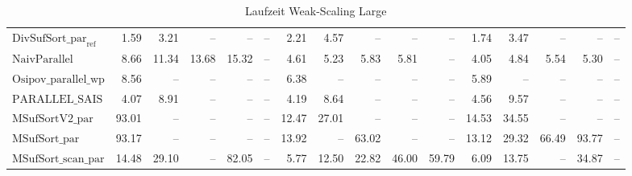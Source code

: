 \begin{table}
{\begin{tabular}{lrrrrrrrrrrrrrrr}
    $\text{DivSufSort\_par}_{\text{ref}}$ & {\color{green!60!black}1.59} & {\color{green!60!black}3.21} & {\color{darkgray}--} & {\color{darkgray}--} & {\color{darkgray}--} & {\color{green!60!black}2.21} & {\color{green!60!black}4.57} & {\color{darkgray}--} & {\color{darkgray}--} & {\color{darkgray}--} & {\color{green!60!black}1.74} & {\color{green!60!black}3.47} & {\color{darkgray}--} & {\color{darkgray}--} & {\color{darkgray}--} \\
    $\text{NaivParallel}$ & 8.66 & {\color{red}11.34} & {\color{red}13.68} & {\color{red}15.32} & {\color{darkgray}--} & 4.61 & 5.23 & {\color{green!60!black}5.83} & {\color{green!60!black}5.81} & {\color{darkgray}--} & 4.05 & 4.84 & {\color{red}5.54} & {\color{green!60!black}5.30} & {\color{darkgray}--} \\
    $\text{Osipov\_parallel\_wp}$ & 8.56 & {\color{darkgray}--} & {\color{darkgray}--} & {\color{darkgray}--} & {\color{darkgray}--} & {\color{red}6.38} & {\color{darkgray}--} & {\color{darkgray}--} & {\color{darkgray}--} & {\color{darkgray}--} & 5.89 & {\color{darkgray}--} & {\color{darkgray}--} & {\color{darkgray}--} & {\color{darkgray}--} \\
    $\text{PARALLEL\_SAIS}$ & {\color{green!60!black}4.07} & 8.91 & {\color{darkgray}--} & {\color{darkgray}--} & {\color{darkgray}--} & 4.19 & {\color{red}8.64} & {\color{darkgray}--} & {\color{darkgray}--} & {\color{darkgray}--} & 4.56 & 9.57 & {\color{darkgray}--} & {\color{darkgray}--} & {\color{darkgray}--} \\
    $\text{MSufSortV2\_par}$ & {\color{red}93.01} & {\color{darkgray}--} & {\color{darkgray}--} & {\color{darkgray}--} & {\color{darkgray}--} & {\color{red}12.47} & {\color{red}27.01} & {\color{darkgray}--} & {\color{darkgray}--} & {\color{darkgray}--} & {\color{red}14.53} & {\color{red}34.55} & {\color{darkgray}--} & {\color{darkgray}--} & {\color{darkgray}--} \\
    $\text{MSufSort\_par}$ & {\color{red}93.17} & {\color{darkgray}--} & {\color{darkgray}--} & {\color{darkgray}--} & {\color{darkgray}--} & {\color{red}13.92} & {\color{darkgray}--} & {\color{red}63.02} & {\color{darkgray}--} & {\color{darkgray}--} & {\color{red}13.12} & {\color{red}29.32} & {\color{red}66.49} & {\color{red}93.77} & {\color{darkgray}--} \\
    $\text{MSufSort\_scan\_par}$ & {\color{red}14.48} & {\color{red}29.10} & {\color{darkgray}--} & {\color{red}82.05} & {\color{darkgray}--} & 5.77 & {\color{red}12.50} & {\color{red}22.82} & {\color{red}46.00} & {\color{red}59.79} & {\color{red}6.09} & {\color{red}13.75} & {\color{darkgray}--} & {\color{red}34.87} & {\color{darkgray}--} \\
\bottomrule
\end{tabular}
}
\caption{Laufzeit Weak-Scaling Large}
\label{messung:tab:duration-weak-large}
\end{table}


